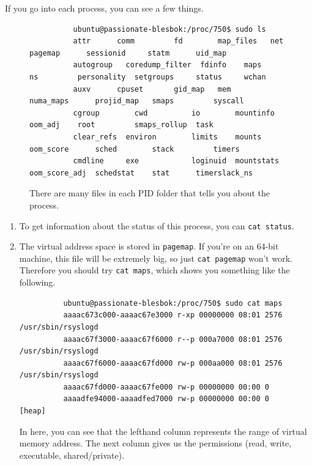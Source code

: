 \documentclass{article}
\newcounter{example}[section]
\begin{document}
\begin{example}
      If you go into each process, you can see a few things.  
      
      \begin{figure}[H]
        \centering 
        \begin{lstlisting}
          ubuntu@passionate-blesbok:/proc/750$ sudo ls
          attr	    comm	     fd        map_files   net		  pagemap      sessionid     statm	    uid_map
          autogroup   coredump_filter  fdinfo    maps	   ns		  personality  setgroups     status	    wchan
          auxv	    cpuset	     gid_map   mem	   numa_maps	  projid_map   smaps	     syscall
          cgroup	    cwd		     io        mountinfo   oom_adj	  root	       smaps_rollup  task
          clear_refs  environ	     limits    mounts	   oom_score	  sched        stack	     timers
          cmdline     exe		     loginuid  mountstats  oom_score_adj  schedstat    stat	     timerslack_ns
        \end{lstlisting}
        \caption{There are many files in each PID folder that tells you about the process. } 
        \label{fig:pid_info}
      \end{figure}
      \begin{enumerate}
        \item To get information about the status of this process, you can \texttt{cat status}. 

        \item The virtual address space is stored in \texttt{pagemap}. If you're on an 64-bit machine, this file will be extremely big, so just \texttt{cat pagemap} won't work. Therefore you should try \texttt{cat maps}, which shows you something like the following. 

        \begin{lstlisting}
          ubuntu@passionate-blesbok:/proc/750$ sudo cat maps
          aaaac673c000-aaaac67e3000 r-xp 00000000 08:01 2576                       /usr/sbin/rsyslogd
          aaaac67f3000-aaaac67f6000 r--p 000a7000 08:01 2576                       /usr/sbin/rsyslogd
          aaaac67f6000-aaaac67fd000 rw-p 000aa000 08:01 2576                       /usr/sbin/rsyslogd
          aaaac67fd000-aaaac67fe000 rw-p 00000000 00:00 0 
          aaaadfe94000-aaaadfed7000 rw-p 00000000 00:00 0                          [heap] 
        \end{lstlisting}
        In here, you can see that the lefthand column represents the range of virtual memory address. The next column gives us the permissions (read, write, executable, shared/private). 
      \end{enumerate}
    \end{example}
\end{document}
